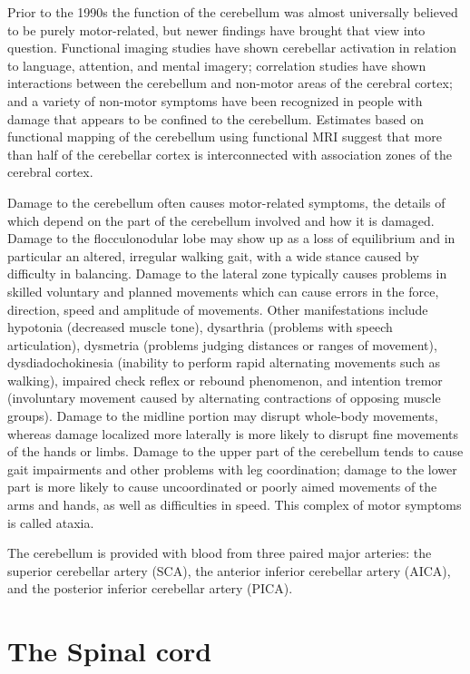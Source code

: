 \documentclass[]{book}
\begin{document}
Prior to the 1990s the function of the cerebellum was almost universally believed to be purely motor-related, but newer findings have brought that view into question. Functional imaging studies have shown cerebellar activation in relation to language, attention, and mental imagery; correlation studies have shown interactions between the cerebellum and non-motor areas of the cerebral cortex; and a variety of non-motor symptoms have been recognized in people with damage that appears to be confined to the cerebellum. Estimates based on functional mapping of the cerebellum using functional MRI suggest that more than half of the cerebellar cortex is interconnected with association zones of the cerebral cortex.

Damage to the cerebellum often causes motor-related symptoms, the details of which depend on the part of the cerebellum involved and how it is damaged. Damage to the flocculonodular lobe may show up as a loss of equilibrium and in particular an altered, irregular walking gait, with a wide stance caused by difficulty in balancing. Damage to the lateral zone typically causes problems in skilled voluntary and planned movements which can cause errors in the force, direction, speed and amplitude of movements. Other manifestations include hypotonia (decreased muscle tone), dysarthria (problems with speech articulation), dysmetria (problems judging distances or ranges of movement), dysdiadochokinesia (inability to perform rapid alternating movements such as walking), impaired check reflex or rebound phenomenon, and intention tremor (involuntary movement caused by alternating contractions of opposing muscle groups). Damage to the midline portion may disrupt whole-body movements, whereas damage localized more laterally is more likely to disrupt fine movements of the hands or limbs. Damage to the upper part of the cerebellum tends to cause gait impairments and other problems with leg coordination; damage to the lower part is more likely to cause uncoordinated or poorly aimed movements of the arms and hands, as well as difficulties in speed. This complex of motor symptoms is called ataxia.

The cerebellum is provided with blood from three paired major arteries: the superior cerebellar artery (SCA), the anterior inferior cerebellar artery (AICA), and the posterior inferior cerebellar artery (PICA).

\hypertarget{the-spinal-cord}{%
\section{The Spinal cord}\label{the-spinal-cord}}
\end{document}
